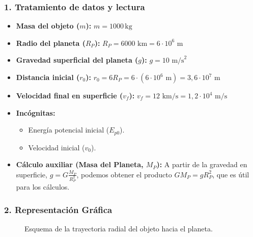\subsubsection*{1. Tratamiento de datos y lectura}
\begin{itemize}
    \item \textbf{Masa del objeto ($m$):} $m = 1000 \, \text{kg}$
    \item \textbf{Radio del planeta ($R_P$):} $R_P = 6000 \text{ km} = 6 \cdot 10^6 \text{ m}$
    \item \textbf{Gravedad superficial del planeta ($g$):} $g = 10 \text{ m/s}^2$
    \item \textbf{Distancia inicial ($r_0$):} $r_0 = 6 R_P = 6 \cdot (6 \cdot 10^6 \text{ m}) = 3,6 \cdot 10^7 \text{ m}$
    \item \textbf{Velocidad final en superficie ($v_f$):} $v_f = 12 \text{ km/s} = 1,2 \cdot 10^4 \text{ m/s}$
    \item \textbf{Incógnitas:}
    \begin{itemize}
        \item Energía potencial inicial ($E_{p0}$).
        \item Velocidad inicial ($v_0$).
    \end{itemize}
    \item \textbf{Cálculo auxiliar (Masa del Planeta, $M_P$):} A partir de la gravedad en superficie, $g = G \frac{M_P}{R_P^2}$, podemos obtener el producto $G M_P = g R_P^2$, que es útil para los cálculos.
\end{itemize}

\subsubsection*{2. Representación Gráfica}
\begin{figure}[H]
    \centering
    \caption{Esquema de la trayectoria radial del objeto hacia el planeta.}
\end{figure}

